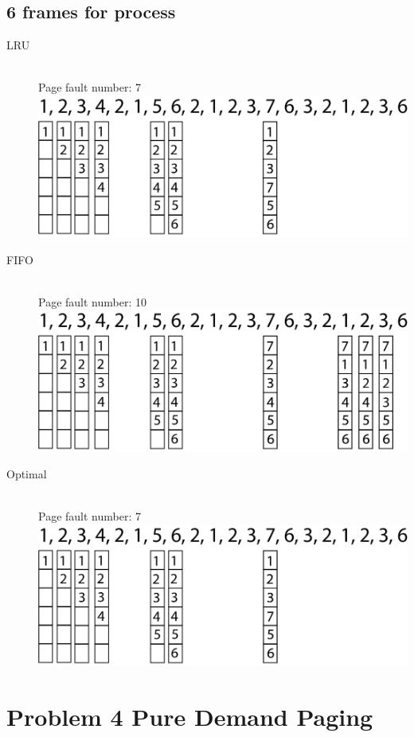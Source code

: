 \documentclass{article}
\begin{document}
\subsection{6 frames for process}
\begin{description}
    \item[LRU] \hfill \\ 
    Page fault number: 7\\ 
    \includegraphics[width=1\linewidth]{./LRU6.png}
    \item[FIFO] \hfill \\
    Page fault number: 10\\ 
    \includegraphics[width=1\linewidth]{./FIFO6.png}
    \item[Optimal] \hfill \\
    Page fault number: 7\\ 
    \includegraphics[width=1\linewidth]{./Optimal6.png}
\end{description}

\newpage
\section{Problem 4 Pure Demand Paging}
\end{document}
